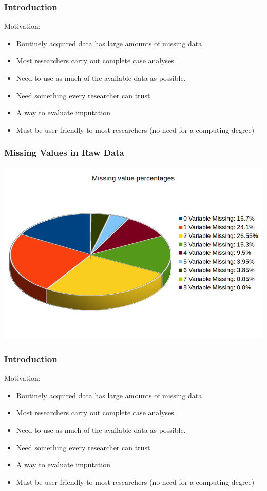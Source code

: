 \documentclass{beamer}
\begin{document}
\begin{frame}
  \frametitle{Introduction}
  Motivation:
  \begin{itemize}
    \item Routinely acquired data has large amounts of missing data
    \item Most researchers carry out complete case analyses
    \item Need to use as much of the available data as possible. 
    \item Need something every researcher can trust
    \item A way to evaluate imputation
    \item Must be user friendly to most researchers (no need for a computing degree)
  \end{itemize}
\end{frame}

\begin{frame}
\frametitle{Missing Values in Raw Data}
\centerline{\includegraphics[width=\paperwidth]{missing-perc-equal}}
\end{frame}


\begin{frame}
  \frametitle{Introduction}
  Motivation:
  \begin{itemize}
    \item Routinely acquired data has large amounts of missing data
    \item Most researchers carry out complete case analyses
    \item Need to use as much of the available data as possible. 
    \item Need something every researcher can trust
    \item A way to evaluate imputation
    \item Must be user friendly to most researchers (no need for a computing degree)
  \end{itemize}
\end{frame}
\end{document}
